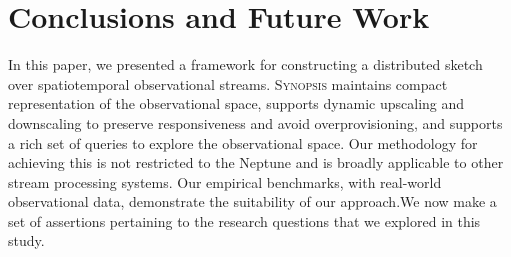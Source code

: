 \section{Conclusions and Future Work}
\label{sec:conclusions}
In this paper, we presented a framework for constructing a distributed sketch over spatiotemporal observational streams. \textsc{Synopsis} maintains compact representation of the observational space, supports dynamic upscaling and downscaling to preserve responsiveness and avoid overprovisioning, and supports a rich set of queries to explore the observational space. Our methodology for achieving this is not restricted to the Neptune and is broadly applicable to other stream processing systems.  Our empirical benchmarks, with real-world observational data, demonstrate the suitability of our approach.We now make a set of assertions pertaining to the research questions that we explored in this study.
